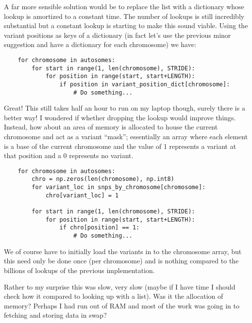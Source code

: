 A far more sensible solution would be to replace the list with a dictionary
whose lookup is amortized to a constant time. The number of lookups is still
incredibly substantial but a constant lookup is starting to make this sound
viable. Using the variant positions as keys of a dictionary (in fact let’s use
the previous minor suggestion and have a dictionary for each chromosome) we
have:

\begin{verbatim}
    for chromosome in autosomes:
        for start in range(1, len(chromosome), STRIDE):
            for position in range(start, start+LENGTH):
                if position in variant_position_dict[chromosome]:
                    # Do something...
\end{verbatim}

Great! This still takes half an hour to run on my laptop though, surely there
is a better way!  I wondered if whether dropping the lookup would improve
things. Instead, how about an area of memory is allocated to house the current
chromosome and act as a variant “mask”; essentially an array where each element
is a base of the current chromosome and the value of 1 represents a variant at
that position and a 0 represents no variant.

\begin{verbatim}
    for chromosome in autosomes:
        chro = np.zeros(len(chromosome), np.int8)
        for variant_loc in snps_by_chromosome[chromosome]:
            chro[variant_loc] = 1

        for start in range(1, len(chromosome), STRIDE):
            for position in range(start, start+LENGTH):
                if chro[position] == 1:
                    # Do something...
\end{verbatim}

We of course have to initially load the variants in to the chromosome array,
but this need only be done once (per chromosome) and is nothing compared to the
billions of lookups of the previous implementation.

Rather to my surprise this was slow, very slow (maybe if I have time I should
check how it compared to looking up with a list). Was it the allocation of
memory? Perhaps I had run out of RAM and most of the work was going in to
fetching and storing data in swap?

